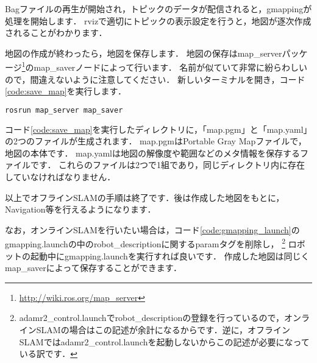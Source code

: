 \documentclass[{../../master}]{subfiles}
\begin{document}
Bagファイルの再生が開始され，トピックのデータが配信されると，\textsf{gmapping}が処理を開始します．
\textsf{rviz}で適切にトピックの表示設定を行うと，地図が逐次作成されることがわかります．

地図の作成が終わったら，地図を保存します．
地図の保存は\textsf{map\_server}パッケージ\footnote{\url{http://wiki.ros.org/map_server}}の\textsf{map\_saver}ノードによって行います．
名前が似ていて非常に紛らわしいので，間違えないように注意してください．
新しいターミナルを開き，コード\ref{code:save_map}を実行します．

\begin{lstlisting}[language=sh, label=code:save_map, caption=Save the Map]
rosrun map_server map_saver
\end{lstlisting}

コード\ref{code:save_map}を実行したディレクトリに，「\textsf{map.pgm}」と「\textsf{map.yaml}」の2つのファイルが生成されます．
\textsf{map.pgm}はPortable Gray Mapファイルで，地図の本体です．
\textsf{map.yaml}は地図の解像度や範囲などのメタ情報を保存するファイルです．
これらのファイルは2つで1組であり，同じディレクトリ内に存在していなければなりません．

以上でオフラインSLAMの手順は終了です．後は作成した地図をもとに，Navigation等を行えるようになります．

なお，オンラインSLAMを行いたい場合は，コード\ref{code:gmapping_launch}の\textsf{gmapping.launch}の中の\textsf{robot\_description}に関する\textsf{param}タグを削除し，
\footnote{\textsf{adamr2\_control.launch}で\textsf{robot\_description}の登録を行っているので，オンラインSLAMの場合はこの記述が余計になるからです．逆に，オフラインSLAMでは\textsf{adamr2\_control.launch}を起動しないからこの記述が必要になっている訳です．}
ロボットの起動中に\textsf{gmapping.launch}を実行すれば良いです．
作成した地図は同じく\textsf{map\_saver}によって保存することができます．
\end{document}
